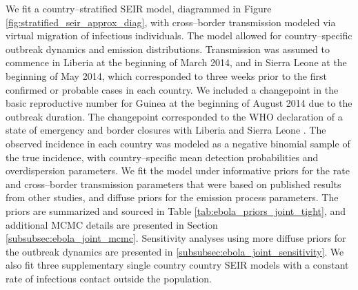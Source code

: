 We fit a country--stratified SEIR model, diagrammed in Figure \ref{fig:stratified_seir_approx_diag}, with cross--border transmission modeled via virtual migration of infectious individuals. The model allowed for country--specific outbreak dynamics and emission distributions. Transmission was assumed to commence in Liberia at the beginning of March 2014, and in Sierra Leone at the beginning of May 2014, which corresponded to three weeks prior to the first confirmed or probable cases in each country. We included a changepoint in the basic reproductive number for Guinea at the beginning of August 2014 due to the outbreak duration. The changepoint corresponded to the WHO declaration of a state of emergency and border closures with Liberia and Sierra Leone \cite{coltart2017ebola}. The observed incidence in each country was modeled as a negative binomial sample of the true incidence, with country--specific mean detection probabilities and overdispersion parameters. We fit the model under informative priors for the rate and cross--border transmission parameters that were based on published results from other studies, and diffuse priors for the emission process parameters. The priors are summarized and sourced in Table \ref{tab:ebola_priors_joint_tight}, and additional MCMC details are presented in Section \ref{subsubsec:ebola_joint_mcmc}. Sensitivity analyses using more diffuse priors for the outbreak dynamics are presented in \ref{subsubsec:ebola_joint_sensitivity}. We also fit three supplementary single country country SEIR models with a constant rate of infectious contact outside the population. 